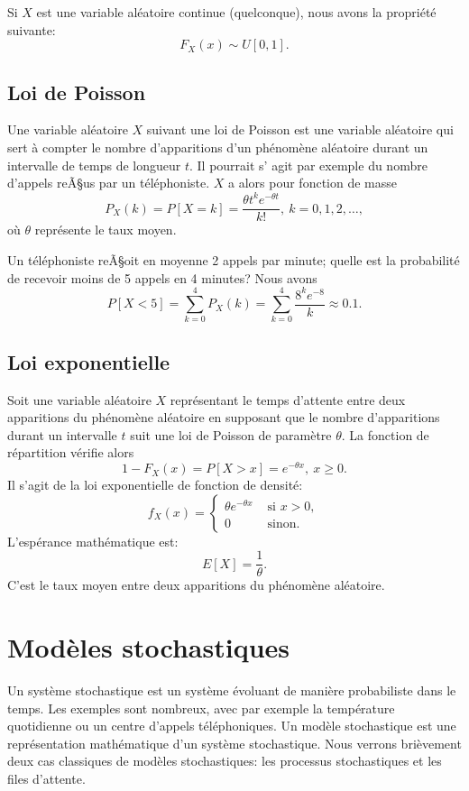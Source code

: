  Si $X$ est une variable aléatoire continue (quelconque), nous avons la propriété suivante:
 \[
 F_X(x) \sim U[0,1].
 \]

\subsection{Loi de Poisson}

Une variable aléatoire $X$ suivant une loi de Poisson est une variable aléatoire qui sert à compter le nombre d'apparitions d'un phénomène aléatoire durant un intervalle de temps de longueur $t$.
Il pourrait s' agit par exemple du nombre d'appels reÃ§us par un téléphoniste.
$X$ a alors pour fonction de masse
\[
P_X(k) = P[X = k] = \frac{{\theta t}^ke^{-\theta t}}{k!},\ k = 0,1,2,\ldots,
\]
où $\theta$ représente le taux moyen.

\begin{example}[Téléphoniste]
Un téléphoniste reÃ§oit en moyenne 2 appels par minute; quelle est la probabilité de
recevoir moins de 5 appels en 4 minutes? Nous avons
\[
P[X < 5] = \sum_{k = 0}^{4} P_X(k) = \sum_{k = 0}^4 \frac{8^k e^{-8}}{k} \approx 0.1.
\]
\end{example}

\subsection{Loi exponentielle}

Soit une variable aléatoire $X$ représentant le temps d'attente entre deux apparitions du phénomène aléatoire en supposant que le nombre d'apparitions durant un intervalle $t$ suit
une loi de Poisson de paramètre $\theta$.
La fonction de répartition vérifie alors
\[
1-F_X(x) = P[ X > x ] = e^{-\theta x},\ x \geq 0.
\]
Il s'agit de la loi exponentielle de fonction de densité:
\[
f_X(x)  =
\begin{cases}
\theta e^{-\theta x} & \mbox{ si } x > 0, \\
0 & \mbox{ sinon.}
\end{cases}
\]
L'espérance mathématique est:
\[
E[X] = \frac{1}{\theta}.
\]
C'est le taux moyen entre deux apparitions du phénomène aléatoire.

\section{Modèles stochastiques}

Un système stochastique est un système évoluant de manière probabiliste dans le temps.
Les exemples sont nombreux, avec par exemple la température quotidienne ou un centre d'appels téléphoniques.
Un modèle stochastique est une représentation mathématique d'un système stochastique.
Nous verrons brièvement deux cas classiques de modèles stochastiques: les processus stochastiques et les files d'attente.

